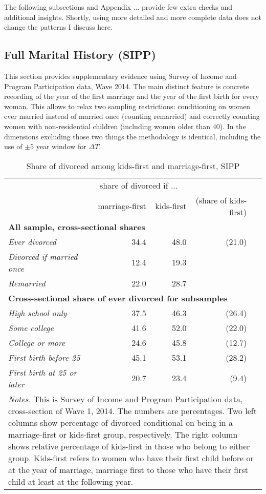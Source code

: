 \documentclass[12pt,letter]{article}
\begin{document}
The following subsections and Appendix ... provide few extra checks and additional insights. Shortly, using more detailed and more complete data does not change the patterns I discuss here. 

\subsection{Full Marital History (SIPP) \label{sipp-results}}
This section provides supplementary evidence using Survey of Income and Program Participation data, Wave 2014. The main distinct feature is concrete recording of the year of the first marriage and the year of the first birth for every woman. This allows to relax two sampling restrictions: conditioning on women ever married instead of married once (counting remarried) and correctly counting women with non-residential children (including women older than 40). In the dimensions excluding those two things the methodology is identical, including the use of $\pm 5$ year window for $\Delta T$.


\begin{table}[h]
\caption{Share of divorced among kids-first and marriage-first, SIPP\label{share_table_0}}
\begin{center}
\begin{tabular}{l r r r r }
\hline
& \multicolumn{2}{c}{share of divorced if ... }&  \\
&  marriage-first & kids-first & (share of kids-first) &  \\\hline
\multicolumn{5}{l}{\textbf{All sample, cross-sectional shares}} \\\hline
\textit{Ever divorced} & 34.4 & 48.0 & (21.0) \\
\textit{Divorced if married once} &  12.4 & 19.3 & \\
\textit{Remarried} &  22.0 & 28.7 &  \\
\multicolumn{5}{l}{\textbf{Cross-sectional share of ever divorced for subsamples}} \\\hline
\textit{High school only} &  37.5 & 46.3 & (26.4) \\
\textit{Some college} & 41.6 & 52.0 & (22.0) \\
\textit{College or more} &   24.6 & 45.8 & (12.7)\\\hline
\textit{First birth before 25} & 45.1 & 53.1 & (28.2) \\
\textit{First birth at 25 or later} &  20.7 & 23.4 & (9.4)  \\\hline
\multicolumn{5}{p{0.8\linewidth}}{\footnotesize \textit{Notes.} This is Survey of Income and Program Participation data, cross-section of Wave 1, 2014. The numbers are percentages. Two left columns show percentage of divorced conditional on being in a marriage-first or kids-first group, respectively. The right column shows relative percentage of kids-first in those who belong to either group. Kids-first refers to women who have their first child before or at the year of marriage, marriage first to those who have their first child at least at the following year. }\\\hline\hline
\end{tabular}
\end{center}
\end{table}
\end{document}
